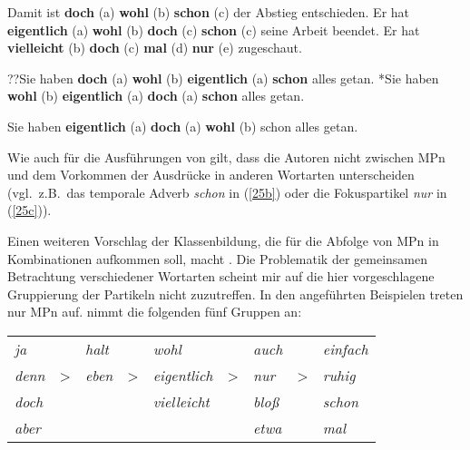 \begin{exe}
	\ex\label{25} 
		\begin{xlist}	
			\ex\label{25a} Damit ist \textbf{doch} (a) \textbf{wohl} (b) \textbf{schon} (c) der Abstieg entschieden.
			\ex\label{25b} Er hat \textbf{eigentlich} (a) \textbf{wohl} (b) \textbf{doch} (c) \textbf{schon} (c) seine Arbeit beendet.
			\ex\label{25c} Er hat \textbf{vielleicht} (b) \textbf{doch} (c) \textbf{mal} (d) \textbf{nur} (e) zugeschaut.
		\end{xlist}
	\hfill\hbox{\citet[42]{Helbig1981}}	
\end{exe}

\begin{exe}
	\ex\label{26} 
		\begin{xlist}	
			\ex\label{26a} ??Sie haben \textbf{doch} (a) \textbf{wohl} (b) \textbf{eigentlich} (a) \textbf{schon} alles getan.
			\ex\label{26b} *Sie haben \textbf{wohl} (b) \textbf{eigentlich} (a) \textbf{doch} (a) \textbf{schon} alles getan.
		\end{xlist}
\end{exe}

\begin{exe}
	\ex\label{27} 
	Sie haben \textbf{eigentlich} (a) \textbf{doch} (a) \textbf{wohl} (b) schon alles getan.
	\newline
	\hbox{}\hfill\hbox{\citet[249]{Abraham1995}}
\end{exe}
Wie auch für die Ausführungen von \citet{Engel1968} gilt, dass die Autoren nicht zwischen MPn und dem Vorkommen der Ausdrücke in anderen Wortarten unterscheiden (vgl.\ z.B.\ das temporale Adverb \textit{schon} in (\ref{25b}) oder die Fokuspartikel \textit{nur} in (\ref{25c})). 

Einen weiteren Vorschlag  der Klassenbildung, die für die Abfolge von MPn in Kombinationen aufkommen soll, macht \citet{Thurmair1991}. Die Problematik der gemeinsamen Betrachtung verschiedener Wortarten scheint mir auf die hier vor\-geschlagene Gruppierung der Partikeln nicht zuzutreffen. In den angeführten Beispielen treten nur MPn auf. \citet[31]{Thurmair1991} nimmt die folgenden fünf Gruppen an:

\begin{exe}
\ex\label{199xy}
\begin{tabular}[t]{lllllllll}
  	\textit{ja} & & \textit{halt} & & \textit{wohl} & & \textit{auch} & & \textit{einfach}\\
  	\textit{denn} & > & \textit{eben} & > & \textit{eigentlich} & > & \textit{nur} & > & \textit{ruhig}\\
  	\textit{doch} & & & & \textit{vielleicht} & & \textit{bloß} & & \textit{schon}\\
  	\textit{aber} & & & & & & \textit{etwa} & & \textit{mal}\\
\end{tabular}
\end{exe}

